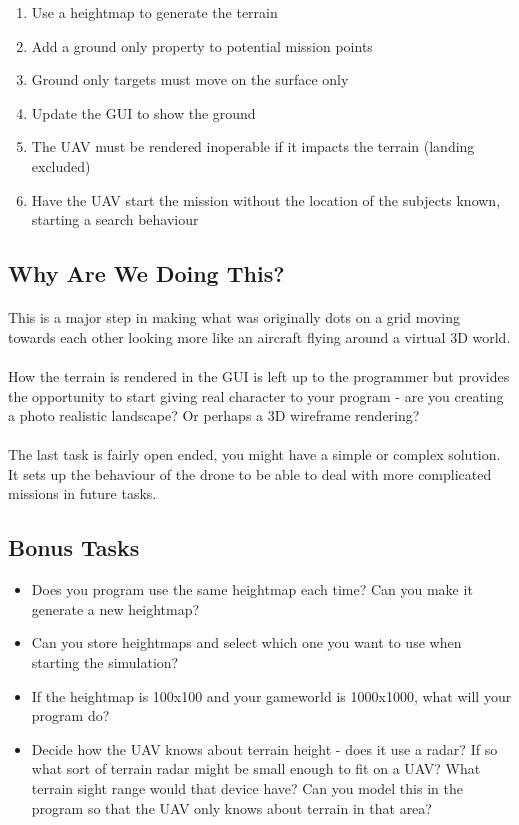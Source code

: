 \documentclass[11pt]{book}
\begin{document}
\begin{enumerate}
\item Use a heightmap to generate the terrain
\item Add a ground only property to potential mission points
\item Ground only targets must move on the surface only
\item Update the GUI to show the ground
\item The UAV must be rendered inoperable if it impacts the terrain (landing excluded)
\item Have the UAV start the mission without the location of the subjects known, starting a search behaviour
\end{enumerate}

\subsection{Why Are We Doing This?}

\paragraph{} This is a major step in making what was originally dots on a grid
moving towards each other looking more like an aircraft flying around a
virtual 3D world.

\paragraph{} How the terrain is rendered in the GUI is left up to the
programmer but provides the opportunity to start giving real character to your
program - are you creating a photo realistic landscape? Or perhaps a 3D
wireframe rendering?

\paragraph{} The last task is fairly open ended, you might have a simple or
complex solution. It sets up the behaviour of the drone to be able to deal
with more complicated missions in future tasks.

\subsection{Bonus Tasks}

\begin{itemize}
\item Does you program use the same heightmap each time? Can you make it generate a new heightmap?
\item Can you store heightmaps and select which one you want to use when starting the simulation?
\item If the heightmap is 100x100 and your gameworld is 1000x1000, what will your program do?
\item Decide how the UAV knows about terrain height - does it use a radar? If so what sort of terrain radar might be small enough to fit on a UAV? What terrain sight range would that device have? Can you model this in the program so that the UAV only knows about terrain in that area?
\end{itemize}
\end{document}

